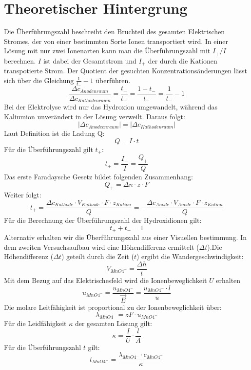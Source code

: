\section{Theoretischer Hintergrung}
Die Überführungszahl beschreibt den Bruchteil des gesamten Elektrischen Stromes, der von einer bestimmten Sorte Ionen transportiert wird. In einer Lösung mit nur zwei Ionenarten kann man die Überführungszahl mit $I_+/I$ berechnen. $I$ ist dabei der Gesamtstrom und $I_+$ der durch die Kationen transpotierte Strom.
Der Quotient der gesuchten Konzentrationsänderungen lässt sich über die Gleichung %
$\frac{1}{t_-}-1$ überführen.
$$\frac{\Delta c_{Anodenraum}}{\Delta c_{Kathodenraum}} = \frac{t_+}{t_-} = \frac{1-t_-}{t_-} = \frac{1}{t_-}- 1$$
Bei der Elektrolyse wird nur das Hydroxion umgewandelt, während das Kaliumion unverändert in der Lösung verweilt. Daraus folgt: %
$$\left|\Delta c_{Anodeenraum}\right| = \left|\Delta c_{Kathodenraum}\right|$$
Laut Definition ist die Ladung Q: %
$$ Q= I\cdot t$$
Für die Überführungszahl gilt $t_+$: %
$$t_+ = \frac{I_+}{I} = \frac{Q_+}{Q}$$
Das erste Faradaysche Gesetz bildet folgenden Zusammenhang: %
$$Q_+ = \Delta n \cdot z \cdot F$$
Weiter folgt: %
 $$t_+ = \frac{\Delta c_{Kathode}\cdot V_{Kathode}\cdot F \cdot  z_{Kation}}{Q} = - \frac{\Delta c_{Anode} \cdot V_{Anode} \cdot F \cdot z_{Kation}}{Q} $$
Für die Berechnung der Überführungszahl der Hydroxidionen gilt: %
$$ t_+ + t_- = 1 $$
Alternativ erhalten wir die Überführungszahl aus einer Visuellen bestimmung.
In dem zweiten Versuchsaufbau wird eine Höhendifferenz ermittelt ($\Delta t$).Die Höhendifferenz ($\Delta t$) geteilt durch die Zeit ($t$) ergibt die Wandergeschwindigkeit: %
$$V_{MnO4^-} = \frac{\Delta h}{t}$$
Mit dem Bezug auf das Elektrischesfeld wird die Ionenbeweglichkeit $U$ erhalten %
$$ u_{MnO4^-} = \frac{u_{MnO4^-}}{\vec{E}} = \frac{u_{MnO4^-} \cdot l}{u}$$
Die molare Leitfähigkeit ist proportional zu der Ionenbeweglichkeit über: %
$$\lambda_{MnO4^-} = zF\cdot u_{MnO4^-}$$
Für die Leidfähigkeit $\kappa$ der gesamten Lösung gilt: %
$$\kappa = \frac{I}{U}\cdot \frac{l}{A}$$
Für die Überführungszahl $t$ gilt: %
 $$ t_{MnO4^-} = \frac{\lambda_{MnO4^-} \cdot c_{MnO4^-}}{\kappa}$$
